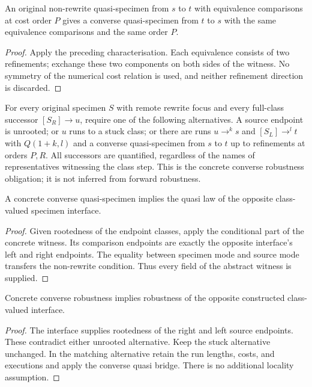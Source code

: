 \begin{lemma}
An original non-rewrite quasi-specimen from $s$ to $t$ with equivalence comparisons at cost order $P$ gives a converse quasi-specimen from $t$ to $s$ with the same equivalence comparisons and the same order $P$.
\end{lemma}
\begin{proof}
Apply the preceding characterisation. Each equivalence consists of two refinements; exchange these two components on both sides of the witness. No symmetry of the numerical cost relation is used, and neither refinement direction is discarded.
\end{proof}

\begin{definition}
For every original specimen $S$ with remote rewrite focus and every full-class successor $[S_R]\to u$, require one of the following alternatives. A source endpoint is unrooted; or $u$ runs to a stuck class; or there are runs $u\to^k s$ and $[S_L]\to^l t$ with $Q(1+k,l)$ and a converse quasi-specimen from $s$ to $t$ up to refinements at orders $P,R$. All successors are quantified, regardless of the names of representatives witnessing the class step. This is the concrete converse robustness obligation; it is not inferred from forward robustness.
\end{definition}

\begin{lemma}
A concrete converse quasi-specimen implies the quasi law of the opposite class-valued specimen interface.
\end{lemma}
\begin{proof}
Given rootedness of the endpoint classes, apply the conditional part of the concrete witness. Its comparison endpoints are exactly the opposite interface's left and right endpoints. The equality between specimen mode and source mode transfers the non-rewrite condition. Thus every field of the abstract witness is supplied.
\end{proof}

\begin{lemma}
Concrete converse robustness implies robustness of the opposite constructed class-valued interface.
\end{lemma}
\begin{proof}
The interface supplies rootedness of the right and left source endpoints. These contradict either unrooted alternative. Keep the stuck alternative unchanged. In the matching alternative retain the run lengths, costs, and executions and apply the converse quasi bridge. There is no additional locality assumption.
\end{proof}

